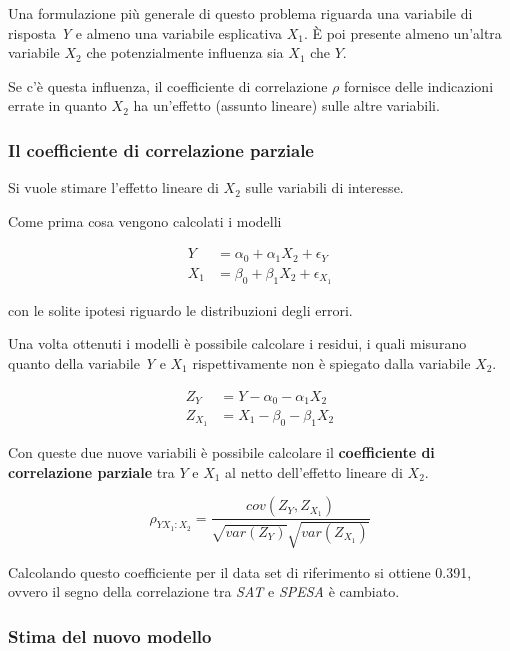 Una formulazione più generale di questo problema riguarda una variabile di risposta \textit{Y} e almeno una variabile esplicativa $ X_1$. \`{E} poi presente almeno un'altra variabile $ X_2 $ che potenzialmente influenza sia $ X_1 $ che $ Y $.

Se c'è questa influenza, il coefficiente di correlazione $ \rho $ fornisce delle indicazioni errate in quanto $ X_2 $ ha un'effetto (assunto lineare) sulle altre variabili.

\subsubsection{Il coefficiente di correlazione parziale}

Si vuole stimare l'effetto lineare di $ X_2 $ sulle variabili di interesse.

Come prima cosa vengono calcolati i modelli

\begin{align*}
	Y &= \alpha_0 + \alpha_1 X_2 + \epsilon_Y \\
	X_1 &= \beta_0 + \beta_1 X_2 + \epsilon_{X_1}
\end{align*}

con le solite ipotesi riguardo le distribuzioni degli errori.

Una volta ottenuti i modelli è possibile calcolare i residui, i quali misurano quanto della variabile \textit{Y} e $ X_1 $ rispettivamente non è spiegato dalla variabile $ X_2 $.

\begin{align*}
Z_{Y} &= Y - \alpha_0 - \alpha_1 X_2 \\
Z_{X_1} &= X_1 - \beta_0 - \beta_1 X_2
\end{align*}

Con queste due nuove variabili è possibile calcolare il \textbf{coefficiente di correlazione parziale} tra $ Y $ e $ X_1 $ al netto dell'effetto lineare di $ X_2 $.

$$
\rho_{YX_1:X_2} = \frac{cov(Z_Y, Z_{X_1})}{\sqrt{var(Z_Y)} \sqrt{var(Z_{X_1})}}
$$

Calcolando questo coefficiente per il data set di riferimento si ottiene 0.391, ovvero il segno della correlazione tra \textit{SAT} e \textit{SPESA} è cambiato. 

\subsubsection{Stima del nuovo modello}

